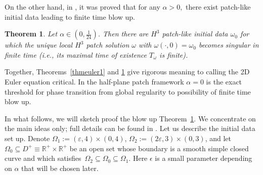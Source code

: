 \documentclass[reqno,centertags, 11pt]{amsart}
\newtheorem{theorem}{Theorem}[section]
\def \Rm {\mathbb R}
\newcommand{\eps}{\varepsilon}
\begin{document}

On the other hand, in \cite{KRYZ}, it was proved that for any $\alpha>0,$ there exist patch-like initial data leading to finite time blow up.
\begin{theorem}\label{main1234}
Let $\alpha\in(0,\frac 1{24})$.  Then there are $H^3$ patch-like initial data $\omega_0$ for which the unique local $H^3$
patch solution $\omega$ with $\omega(\cdot,0)=\omega_0$
becomes singular in finite time (i.e., its maximal time of existence $T_\omega$ is finite).
\end{theorem}
Together, Theorems~\ref{thmeuler1} and \ref{main1234} give rigorous meaning to calling the 2D Euler equation critical. In the half-plane patch framework
$\alpha=0$ is the exact threshold for phase transition from global regularity to possibility of finite time blow up.

In what follows, we will sketch proof the blow up Theorem~\ref{main1234}.
We concentrate on the main ideas only; full details can be found in \cite{KRYZ}.
Let us describe the initial data set up.%
Denote $\Omega_1:=(\eps,4)\times(0,4)$, $\Omega_2:=(2\eps,3)\times(0,3)$, and
let $\Omega_0 \subseteq D^+ \equiv \Rm^+ \times \Rm^+$ be an open set whose boundary is a smooth simple closed curve and
which satisfies~$\Omega_2 \subseteq \Omega_0 \subseteq \Omega_1$. Here $\epsilon$ is a small parameter
depending on $\alpha$ that will be chosen later.
\end{document}
